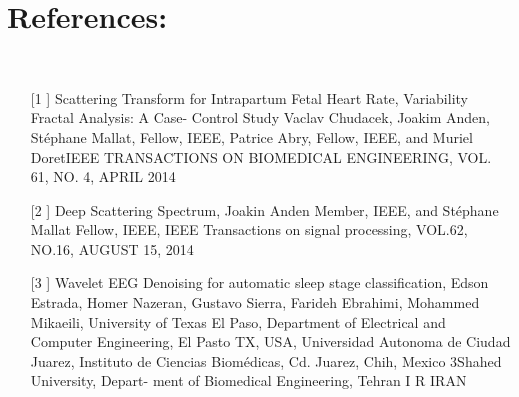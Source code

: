 \documentclass[onecolumn,12pt]{article}
\begin{document}
	\section{References:}
	~\\
	\begin{itemize}
		\item[[1]] Scattering Transform for Intrapartum Fetal Heart Rate, Variability Fractal Analysis: A Case-
		Control Study Vaclav Chudacek, Joakim Anden, Stéphane Mallat, Fellow, IEEE, Patrice Abry, Fellow, IEEE, and Muriel DoretIEEE TRANSACTIONS ON BIOMEDICAL ENGINEERING, VOL. 61, NO. 4, APRIL 2014\\
		
		\item[[2]] Deep Scattering Spectrum, Joakin Anden Member, IEEE, and Stéphane Mallat Fellow, IEEE, IEEE Transactions on signal processing, VOL.62, NO.16, AUGUST 15, 2014\\
		
		\item[[3]] Wavelet EEG Denoising for automatic sleep stage classification, Edson Estrada, Homer Nazeran, Gustavo Sierra, Farideh Ebrahimi, Mohammed Mikaeili, University of Texas El Paso, Department of Electrical and Computer Engineering, El Pasto TX, USA, Universidad Autonoma de Ciudad Juarez, Instituto de Ciencias Biomédicas, Cd. Juarez, Chih, Mexico 3Shahed University, Depart-
		ment of Biomedical Engineering, Tehran I R IRAN
	\end{itemize}
	
\end{document}
